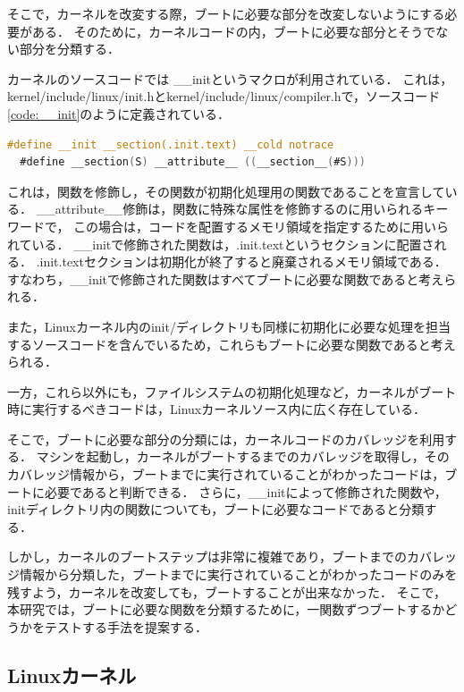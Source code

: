 \documentclass[graduation-thesis]{mlarticle}
\begin{document}
そこで，カーネルを改変する際，ブートに必要な部分を改変しないようにする必要がある．
そのために，カーネルコードの内，ブートに必要な部分とそうでない部分を分類する．

カーネルのソースコードでは \_\_initというマクロが利用されている．
これは，kernel/include/linux/init.hとkernel/include/linux/compiler.hで，ソースコード\ref{code:__init}のように定義されている．

\begin{lstlisting}[language=C, caption=\_\_initマクロの定義, label=code:__init]
  #define __init __section(.init.text) __cold notrace
  #define __section(S) __attribute__ ((__section__(#S)))
\end{lstlisting}

これは，関数を修飾し，その関数が初期化処理用の関数であることを宣言している．
\_\_attribute\_\_修飾は，関数に特殊な属性を修飾するのに用いられるキーワードで，
この場合は，コードを配置するメモリ領域を指定するために用いられている．
\_\_initで修飾された関数は，.init.textというセクションに配置される．
.init.textセクションは初期化が終了すると廃棄されるメモリ領域である．
すなわち，\_\_initで修飾された関数はすべてブートに必要な関数であると考えられる．

また，Linuxカーネル内のinit/ディレクトリも同様に初期化に必要な処理を担当するソースコードを含んでいるため，これらもブートに必要な関数であると考えられる．

一方，これら以外にも，ファイルシステムの初期化処理など，カーネルがブート時に実行するべきコードは，Linuxカーネルソース内に広く存在している．

そこで，ブートに必要な部分の分類には，カーネルコードのカバレッジを利用する．
マシンを起動し，カーネルがブートするまでのカバレッジを取得し，そのカバレッジ情報から，ブートまでに実行されていることがわかったコードは，ブートに必要であると判断できる．
さらに，\_\_initによって修飾された関数や，initディレクトリ内の関数についても，ブートに必要なコードであると分類する．

しかし，カーネルのブートステップは非常に複雑であり，ブートまでのカバレッジ情報から分類した，ブートまでに実行されていることがわかったコードのみを残すよう，カーネルを改変しても，ブートすることが出来なかった．
そこで，本研究では，ブートに必要な関数を分類するために，一関数ずつブートするかどうかをテストする手法を提案する．

\subsection{Linuxカーネル}
\label{propo:linux}
\end{document}
